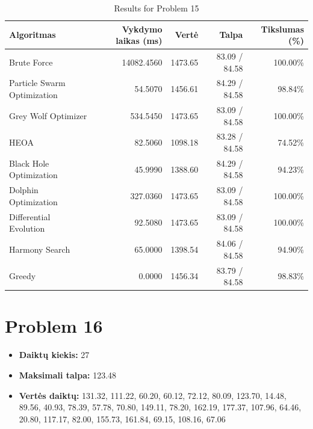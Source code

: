 \documentclass[a4paper,11pt]{article}
\begin{document}
\begin{table}[h!]
\centering
\begin{tabular}{lrrrr}
\toprule
\textbf{Algoritmas} & \textbf{Vykdymo laikas (ms)} & \textbf{Vertė} & \textbf{Talpa} & \textbf{Tikslumas (\%)} \\
\midrule
Brute Force & 14082.4560 & 1473.65 & 83.09 / 84.58 & 100.00\% \\
Particle Swarm Optimization & 54.5070 & 1456.61 & 84.29 / 84.58 & 98.84\% \\
Grey Wolf Optimizer & 534.5450 & 1473.65 & 83.09 / 84.58 & 100.00\% \\
HEOA & 82.5060 & 1098.18 & 83.28 / 84.58 & 74.52\% \\
Black Hole Optimization & 45.9990 & 1388.60 & 84.29 / 84.58 & 94.23\% \\
Dolphin Optimization & 327.0360 & 1473.65 & 83.09 / 84.58 & 100.00\% \\
Differential Evolution & 92.5080 & 1473.65 & 83.09 / 84.58 & 100.00\% \\
Harmony Search & 65.0000 & 1398.54 & 84.06 / 84.58 & 94.90\% \\
Greedy & 0.0000 & 1456.34 & 83.79 / 84.58 & 98.83\% \\
\bottomrule
\end{tabular}
\caption{Results for Problem 15}
\end{table}
\clearpage

\section*{Problem 16}
\begin{itemize}
    \item \textbf{Daiktų kiekis:} 27
    \item \textbf{Maksimali talpa:} 123.48
    \item \textbf{Vertės daiktų:} 131.32, 111.22, 60.20, 60.12, 72.12, 80.09, 123.70, 14.48, 89.56, 40.93, 78.39, 57.78, 70.80, 149.11, 78.20, 162.19, 177.37, 107.96, 64.46, 20.80, 117.17, 82.00, 155.73, 161.84, 69.15, 108.16, 67.06
\end{itemize}
\end{document}

